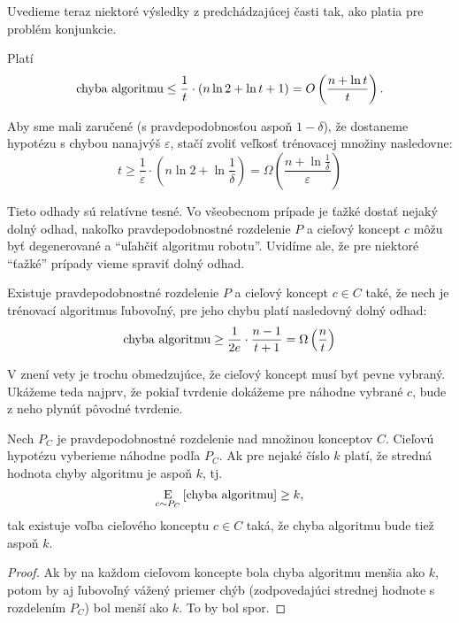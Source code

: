 Uvedieme teraz niektoré výsledky z predchádzajúcej časti tak, ako platia
pre problém konjunkcie.

\begin{corollary}
  Platí
  $$ \text{\normalfont chyba algoritmu} \leq \frac{1}{t} \cdot \left( n \ln{2} + \ln{t} + 1 \right) = O\left( \frac{n + \ln{t}}{t} \right). $$
\end{corollary}
\begin{corollary} \label{cor:mconj_de}
  Aby sme mali zaručené (s pravdepodobnosťou aspoň $1 - \delta$), že
  dostaneme hypotézu s chybou nanajvýš $\varepsilon$, stačí zvoliť
  veľkosť trénovacej množiny nasledovne:
  $$ t \geq \frac{1}{\varepsilon} \cdot \left( n \ln{2} + \ln{\frac{1}{\delta}} \right) = \Omega\left( \frac{n + \ln{\frac{1}{\delta}}}{\varepsilon} \right) $$
\end{corollary}

Tieto odhady sú relatívne tesné. Vo všeobecnom prípade je ťažké dostať
nejaký dolný odhad, nakoľko pravdepodobnostné rozdelenie $P$ a cieľový
koncept $c$ môžu byť degenerované a ``uľahčiť algoritmu robotu''.
Uvidíme ale, že pre niektoré ``ťažké'' prípady vieme spraviť dolný odhad.

\begin{theorem} \label{thm:mconj_lb}
  Existuje pravdepodobnostné rozdelenie $P$ a cieľový koncept $c \in C$
  také, že nech je trénovací algoritmus ľubovoľný, pre jeho chybu platí
  nasledovný dolný odhad:
  $$ \text{\normalfont chyba algoritmu} \geq \frac{1}{2e} \cdot \frac{n-1}{t+1} = \Omega \left( \frac{n}{t} \right)$$
\end{theorem}

V znení vety je trochu obmedzujúce, že cieľový koncept musí byť
pevne vybraný. Ukážeme teda najprv, že pokiaľ tvrdenie dokážeme
pre náhodne vybrané $c$, bude z neho plynúť pôvodné tvrdenie.

\begin{lemma}
  Nech $P_C$ je pravdepodobnostné rozdelenie nad množinou konceptov $C$.
  Cieľovú hypotézu vyberieme náhodne podľa $P_C$. Ak pre nejaké číslo
  $k$ platí, že stredná hodnota chyby algoritmu je aspoň $k$, tj.
  $$\operatorname*{\mathrm{E}}_{c \sim P_C} \left[ \text{\normalfont chyba algoritmu} \right] \geq k,$$
  tak existuje voľba cieľového konceptu $c \in C$ taká, že chyba
  algoritmu bude tiež aspoň $k$.
\end{lemma}
\begin{proof}
  Ak by na každom cieľovom koncepte bola chyba algoritmu menšia ako $k$,
  potom by aj ľubovoľný vážený priemer chýb (zodpovedajúci strednej
  hodnote s rozdelením $P_C$) bol menší ako $k$. To by bol spor.
\end{proof}

